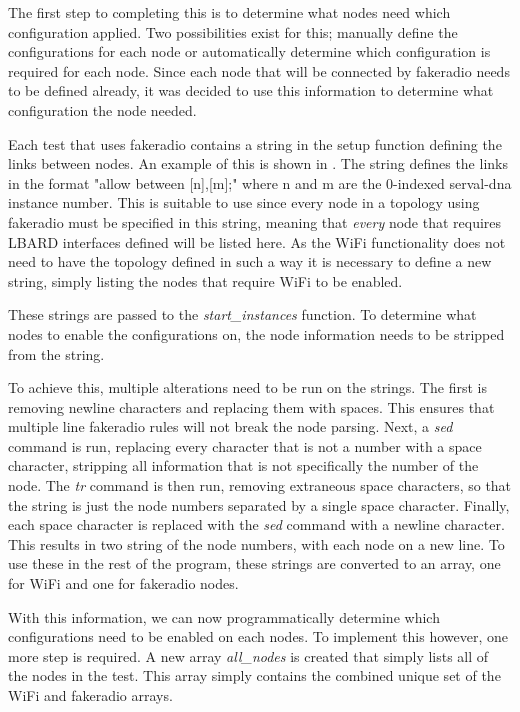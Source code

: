 
The first step to completing this is to determine what nodes need which configuration applied.
Two possibilities exist for this; manually define the configurations for each node or automatically determine which configuration is required for each node.
Since each node that will be connected by fakeradio needs to be defined already, it was decided to use this information to determine what configuration the node needed.

Each test that uses fakeradio contains a string in the setup function defining the links between nodes.
An example of this is shown in . 
The string defines the links in the format "allow between [n],[m];" where n and m are the 0-indexed serval-dna instance number.
This is suitable to use since every node in a topology using fakeradio must be specified in this string, meaning that \emph{every} node that requires LBARD interfaces defined will be listed here.
As the WiFi functionality does not need to have the topology defined in such a way it is necessary to define a new string, simply listing the nodes that require WiFi to be enabled. 

These strings are passed to the \emph{start\_instances} function. 
To determine what nodes to enable the configurations on, the node information needs to be stripped from the string.

To achieve this, multiple alterations need to be run on the strings.
The first is removing newline characters and replacing them with spaces.
This ensures that multiple line fakeradio rules will not break the node parsing.
Next, a \emph{sed} command is run, replacing every character that is not a number with a space character, stripping all information that is not specifically the number of the node.
The \emph{tr} command is then run, removing extraneous space characters, so that the string is just the node numbers separated by a single space character.
Finally, each space character is replaced with the \emph{sed} command with a newline character.
This results in two string of the node numbers, with each node on a new line.
To use these in the rest of the program, these strings are converted to an array, one for WiFi and one for fakeradio nodes.

With this information, we can now programmatically determine which configurations need to be enabled on each nodes.
To implement this however, one more step is required.
A new array \emph{all\_nodes} is created that simply lists all of the nodes in the test.
This array simply contains the combined unique set of the WiFi and fakeradio arrays.


